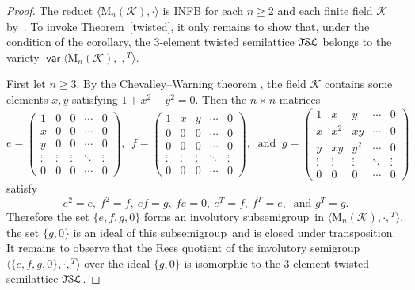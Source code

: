 \documentclass[smallextended]{svjour3}
\newcommand{\sgp}{semi\-group}
\newcommand{\is}{involutory semi\-group}
\newcommand{\TSL}{\ensuremath{\mathcal{T\kern-.5pt S\kern-.5pt L}}}
\DeclareMathOperator{\var}{\mathsf{var}}
\begin{document}
\begin{proof}
The reduct $\langle\mathrm{M}_n(\mathcal{K}),\cdot\rangle$ is INFB for each $n\ge2$ and each finite field $\mathcal{K}$
by~\cite[Corollary~6.2]{sapirburnside}. To invoke Theorem~\ref{twisted}, it only remains to show that, under the condition of the
corollary, the 3-element twisted semilattice $\TSL$ belongs to the variety $\var\langle\mathrm{M}_n(\mathcal{K}),\cdot,{}^T\rangle$.

First let $n\ge3$. By the Chevalley--Warning theorem \cite[Corollary~2 in \S1.2]{Serre}, the field $\mathcal{K}$ contains some elements
$x,y$ satisfying $1+x^2+y^2=0$. Then the $n\times n$-matrices
$$e=\begin{pmatrix}
1 & 0 & 0 & \cdots & 0\\
x & 0 & 0 & \cdots & 0\\
y & 0 & 0 & \cdots & 0\\
\vdots & \vdots & \vdots &\ddots & \vdots\\
0 & 0 & 0 & \cdots & 0
\end{pmatrix},\ \ f=
\begin{pmatrix} 1 & x & y & \cdots & 0\\
0 & 0 & 0 & \cdots & 0\\
0 & 0 & 0 & \cdots & 0\\
\vdots & \vdots & \vdots &\ddots & \vdots\\
0 & 0 & 0 & \cdots & 0
\end{pmatrix},\ \text{ and }\
g=
\begin{pmatrix} 1 & x & y & \cdots & 0\\
x & x^2 & xy & \cdots & 0\\
y & xy & y^2 & \cdots & 0\\
\vdots & \vdots & \vdots &\ddots & \vdots\\
0 & 0 & 0 & \cdots & 0
\end{pmatrix}$$
satisfy
$$e^2=e,\ f^2=f,\ ef=g,\ fe=0,\ e^T=f,\ f^T=e,\ \text{ and } g^T=g.$$
Therefore the set $\{e,f,g,0\}$ forms an involutory sub\sgp\ in $\langle\mathrm{M}_n(\mathcal{K}),\cdot,{}^T\rangle$, the set $\{g,0\}$ is
an ideal of this sub\sgp\ and is closed under transposition. It remains to observe that the Rees quotient of the \is\
$\langle\{e,f,g,0\},\cdot,{}^T\rangle$ over the ideal $\{g,0\}$ is isomorphic to the 3-element twisted semilattice $\TSL$.


\end{proof}
\end{document}
